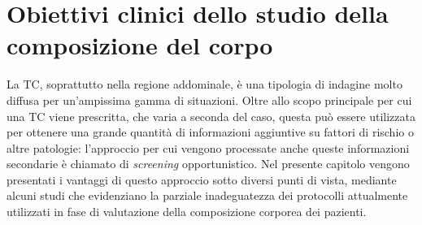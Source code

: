 \chapter{Obiettivi clinici dello studio della composizione del corpo}\label{capitolo2}
La TC, soprattutto nella regione addominale, è una tipologia di indagine molto diffusa per un’ampissima gamma di situazioni. Oltre allo scopo principale per cui una TC viene prescritta, che varia a seconda del caso, questa può essere utilizzata per ottenere una grande quantità di informazioni aggiuntive su fattori di rischio o altre patologie: l’approccio per cui vengono processate anche queste informazioni secondarie è chiamato di \textit{screening} opportunistico. Nel presente capitolo vengono presentati i vantaggi di questo approccio sotto diversi punti di vista, mediante alcuni studi che evidenziano la parziale inadeguatezza dei protocolli attualmente utilizzati in fase di valutazione della composizione corporea dei pazienti.

